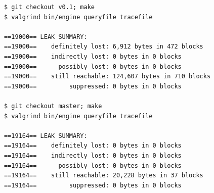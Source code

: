 \begin{lstlisting}
$ git checkout v0.1; make
$ valgrind bin/engine queryfile tracefile

==19000== LEAK SUMMARY:
==19000==    definitely lost: 6,912 bytes in 472 blocks
==19000==    indirectly lost: 0 bytes in 0 blocks
==19000==      possibly lost: 0 bytes in 0 blocks
==19000==    still reachable: 124,607 bytes in 710 blocks
==19000==         suppressed: 0 bytes in 0 blocks

$ git checkout master; make
$ valgrind bin/engine queryfile tracefile

==19164== LEAK SUMMARY:
==19164==    definitely lost: 0 bytes in 0 blocks
==19164==    indirectly lost: 0 bytes in 0 blocks
==19164==      possibly lost: 0 bytes in 0 blocks
==19164==    still reachable: 20,228 bytes in 37 blocks
==19164==         suppressed: 0 bytes in 0 blocks
\end{lstlisting}

